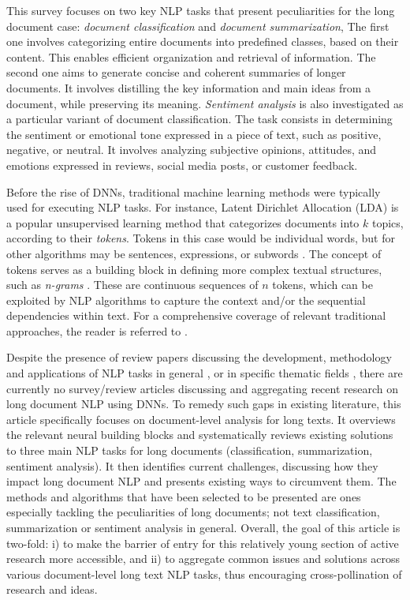 \documentclass[preprint,review,10pt]{elsarticle}
\begin{document}
	This survey focuses on two key NLP tasks that present peculiarities for the long document case: \textit{document classification} and \textit{document summarization}, The first one involves categorizing entire documents into predefined classes, based on their content. This enables efficient organization and retrieval of information. The second one aims to generate concise and coherent summaries of longer documents. It involves distilling the key information and main ideas from a document, while preserving its meaning. \textit{Sentiment analysis} is also investigated as a particular variant of document classification. The task consists in determining the sentiment or emotional tone expressed in a piece of text, such as positive, negative, or neutral. It involves analyzing subjective opinions, attitudes, and emotions expressed in reviews, social media posts, or customer feedback.
	
	Before the rise of DNNs, traditional machine learning methods were typically used for executing NLP tasks. For instance, Latent Dirichlet Allocation (LDA) \cite{dirichet} is a popular unsupervised learning method that categorizes documents into $k$ topics, according to their \textit{tokens}. Tokens in this case would be individual words, but for other algorithms may be sentences, expressions, or subwords \cite{tokens}. The concept of tokens serves as a building block in defining more complex textual structures, such as \textit{n-grams} \cite{ngrams}. These are continuous sequences of $n$ tokens, which can be exploited by NLP algorithms to capture the context and/or the sequential dependencies within text. For a comprehensive coverage of relevant traditional approaches, the reader is referred to \cite{korde}.
	
	Despite the presence of review papers discussing the development, methodology and applications of NLP tasks in general \cite{kowasari} \cite{torfi} \cite{chai}, or in specific thematic fields \cite{nielker} \cite{qian} \cite{gupta} \cite{hussein}, there are currently no survey/review articles discussing and aggregating recent research on long document NLP using DNNs. To remedy such gaps in existing literature, this article specifically focuses on document-level analysis for long texts. It overviews the relevant neural building blocks and systematically reviews existing solutions to three main NLP tasks for long documents (classification, summarization, sentiment analysis). It then identifies current challenges, discussing how they impact long document NLP and presents existing ways to circumvent them. The methods and algorithms that have been selected to be presented are ones especially tackling the peculiarities of long documents; not text classification, summarization or sentiment analysis in general. Overall, the goal of this article is two-fold: i) to make the barrier of entry for this relatively young section of active research more accessible, and ii) to aggregate common issues and solutions across various document-level long text NLP tasks, thus encouraging cross-pollination of research and ideas.
	
\end{document}

